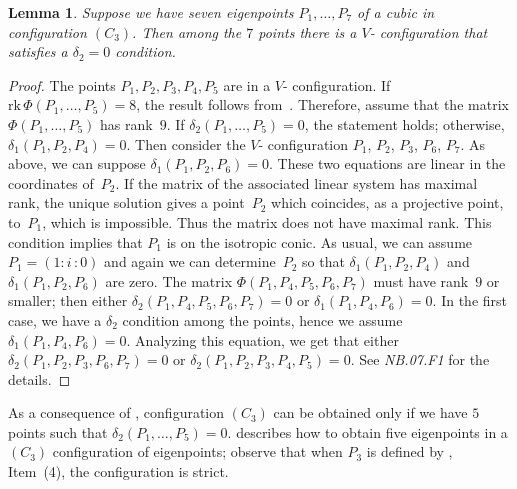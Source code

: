 \documentclass[a4paper, 11pt, reqno]{amsart}
\theoremstyle{plain}
\newtheorem{lemma}{Lemma}[section]
\theoremstyle{definition}
\newcommand{\nb}[2]{\textsl{{NB}.{#1}.{#2}}}
\newcommand{\iii}{\textit{i}\,}
\newcommand{\rk}{\ensuremath{\mathrm{rk}}}
\begin{document}
\begin{lemma}
\label{lemma:no_delta1_delta1} 
Suppose we have seven eigenpoints $P_1, \dots, P_7$
of a cubic in configuration $(C_3)$. Then among the $7$ points there is a
$V$- configuration that satisfies a $\delta_2 = 0$ condition.
\end{lemma}
\begin{proof}
The points $P_1, P_2, P_3, P_4, P_5$ are in a $V$- configuration.
If $\rk \, \Phi(P_1, \dots, P_5) = 8$, the result follows from~.
Therefore, assume that the matrix $\Phi(P_1, \dots, P_5)$ has rank~$9$.
If $\delta_2(P_1, \dots, P_5) = 0$, the statement holds;
otherwise, $\delta_1(P_1, P_2, P_4) = 0$.
Then consider the $V$- configuration $P_1$, $P_2$, $P_3$, $P_6$, $P_7$.
As above, we can suppose $\delta_1(P_1, P_2, P_6) = 0$.
These two equations are
linear in the coordinates of~$P_2$.
If the matrix of the associated linear system has
maximal rank, the unique solution gives a point~$P_2$ which coincides, as a projective point, to~$P_1$, which is impossible.
Thus the matrix does not have maximal rank.
This condition implies that $P_1$ is on the
isotropic conic. As usual, we can assume 
$P_1 = (1: \iii: 0)$ and again
we can determine~$P_2$ so that $\delta_1(P_1, P_2, P_4)$ and
$\delta_1(P_1, P_2, P_6)$ are zero. The matrix $\Phi(P_1, P_4, P_5, P_6, P_7)$
must have rank~$9$ or smaller; then either
$\delta_2(P_1, P_4, P_5, P_6, P_7)=0$ or $\delta_1(P_1, P_4, P_6) = 0$. In
the first case, we have a $\delta_2$ condition among the points, hence
we assume $\delta_1(P_1, P_4, P_6) = 0$. Analyzing this equation, we get that either
$\delta_2(P_1, P_2, P_3, P_6, P_7) = 0$ or
$\delta_2(P_1, P_2, P_3, P_4, P_5) = 0$.
See  \nb{07}{F1} for the details.
\end{proof}

As a consequence of , configuration $(C_3)$ can
be obtained only if we have $5$ points such that
$\delta_2(P_1, \dotsc, P_5) = 0$.  describes how to
obtain five eigenpoints in a $(C_3)$ configuration of eigenpoints; observe that when $P_3$ is defined by , Item~(4), the configuration is strict.
\end{document}
